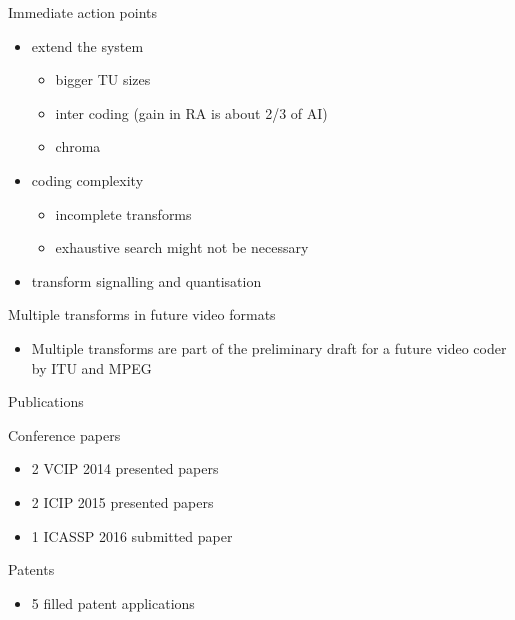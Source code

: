 \documentclass[10pt]{beamer} %
\makeatletter
\newcommand*{\currentname}{\@currentlabelname}
\makeatother
\begin{document}
\begin{frame}{\currentname}
	\begin{block}{Immediate action points}
		\begin{itemize}
			\item extend the system
				\begin{itemize}
					\item bigger TU sizes
					\item inter coding (gain in RA is about 2/3 of AI)
					\item chroma
				\end{itemize}
			\item coding complexity
				\begin{itemize}
					\item incomplete transforms
					\item exhaustive search might not be necessary
				\end{itemize}
			\item transform signalling and quantisation
		\end{itemize}
	\end{block}
	\begin{block}{Multiple transforms in future video formats}
		\begin{itemize}
			\item Multiple transforms are part of the preliminary draft for a
				future video coder by ITU and MPEG
		\end{itemize}
	\end{block}
\end{frame}

\begin{frame}{Publications}
	\begin{block}{Conference papers}
		\begin{itemize}
			\item 2 VCIP 2014 presented papers
			\item 2 ICIP 2015 presented papers
			\item 1 ICASSP 2016 submitted paper
		\end{itemize}
	\end{block}
	\begin{block}{Patents}
		\begin{itemize}
			\item 5 filled patent applications
		\end{itemize}
	\end{block}
\end{frame}
\end{document}

